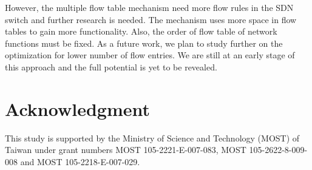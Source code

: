 \documentclass[conference]{IEEEtran}
\begin{document}
However, the multiple flow table mechanism need more flow rules in the SDN switch and further research is needed. The mechanism uses more space in flow tables to gain more functionality. Also, the order of flow table of network functions must be fixed. As a future work, we plan to study further on the optimization for lower number of flow entries. We are still at an early stage of this approach and the full potential is yet to be revealed.


\section*{Acknowledgment}
This study is supported by the Ministry of Science and Technology (MOST) of Taiwan under grant numbers MOST 105-2221-E-007-083, MOST 105-2622-8-009-008 and MOST 105-2218-E-007-029.




\end{document}
